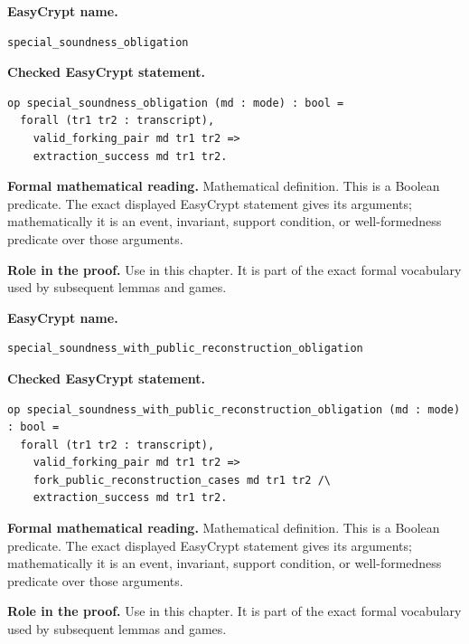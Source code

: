 \begin{formaldefinition}
\noindent\textbf{EasyCrypt name.}
\begin{lstlisting}[language=EasyCrypt,basicstyle=\ttfamily\scriptsize]
special_soundness_obligation
\end{lstlisting}
\noindent\textbf{Checked EasyCrypt statement.}
\begin{lstlisting}[language=EasyCrypt,basicstyle=\ttfamily\scriptsize]
op special_soundness_obligation (md : mode) : bool =
  forall (tr1 tr2 : transcript),
    valid_forking_pair md tr1 tr2 =>
    extraction_success md tr1 tr2.
\end{lstlisting}
\noindent\textbf{Formal mathematical reading.}
Mathematical definition. This is a Boolean predicate.  The exact displayed EasyCrypt statement gives its arguments; mathematically it is an event, invariant, support condition, or well-formedness predicate over those arguments.

\noindent\textbf{Role in the proof.}
Use in this chapter. It is part of the exact formal vocabulary used by subsequent lemmas and games.

\end{formaldefinition}

\begin{formaldefinition}
\noindent\textbf{EasyCrypt name.}
\begin{lstlisting}[language=EasyCrypt,basicstyle=\ttfamily\scriptsize]
special_soundness_with_public_reconstruction_obligation
\end{lstlisting}
\noindent\textbf{Checked EasyCrypt statement.}
\begin{lstlisting}[language=EasyCrypt,basicstyle=\ttfamily\scriptsize]
op special_soundness_with_public_reconstruction_obligation (md : mode) : bool =
  forall (tr1 tr2 : transcript),
    valid_forking_pair md tr1 tr2 =>
    fork_public_reconstruction_cases md tr1 tr2 /\
    extraction_success md tr1 tr2.
\end{lstlisting}
\noindent\textbf{Formal mathematical reading.}
Mathematical definition. This is a Boolean predicate.  The exact displayed EasyCrypt statement gives its arguments; mathematically it is an event, invariant, support condition, or well-formedness predicate over those arguments.

\noindent\textbf{Role in the proof.}
Use in this chapter. It is part of the exact formal vocabulary used by subsequent lemmas and games.

\end{formaldefinition}

